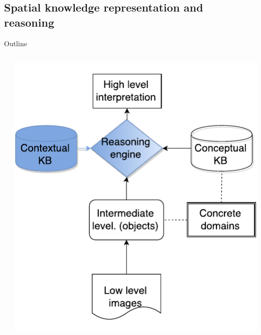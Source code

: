 \documentclass{beamer}
\begin{document}
\subsection{Spatial knowledge representation and reasoning}
\begin{frame}{Outline}
\begin{columns}
 \begin{column}{0.6\textwidth}
  \tableofcontents[currentsection,hideothersubsections,subsectionstyle=show/shaded]
 \end{column}

 \begin{column}{.4\textwidth}
  \includegraphics[width=.9\textwidth]{images/flowchart_sr_crop.pdf}
 \end{column}
\end{columns}
\end{frame}
\end{document}
